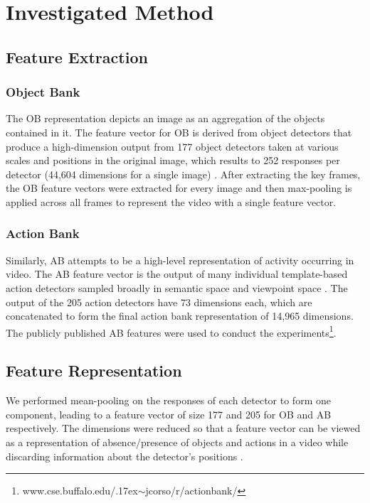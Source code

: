 \documentclass[MIRU]{miru2015e}
\begin{document}
\section{Investigated Method}

\subsection{Feature Extraction}
\subsubsection{Object Bank}
The OB representation depicts an image as an aggregation of the objects contained in it. The feature vector for OB is derived from object detectors that produce a high-dimension output from 177 object detectors taken at various scales and positions in the original image, which results to 252 responses per detector (44,604 dimensions for a single image) \cite{liobjectbank}. After extracting the key frames, the OB feature vectors were extracted for every image and then max-pooling is applied across all frames to represent the video with a single feature vector.

\subsubsection{Action Bank}
Similarly, AB attempts to be a high-level representation of activity occurring in video. The AB feature vector is the output of many individual template-based action detectors sampled broadly in semantic space and viewpoint space \cite{corsoab}. The output of the 205 action detectors have 73 dimensions each, which are concatenated to form the final action bank representation of 14,965 dimensions. The publicly published AB features were used to conduct the experiments\footnote{www.cse.buffalo.edu/{\raise.17ex\hbox{$\scriptstyle\sim$}}jcorso/r/actionbank/}.

\subsection{Feature Representation}
We performed mean-pooling on the responses of each detector to form one component, leading to a feature vector of size 177 and 205 for OB and AB respectively. The dimensions were reduced so that a feature vector can be viewed as a representation of absence/presence of objects and actions in a video while discarding information about the detector's positions \cite{obdimreduce}.
\end{document}
